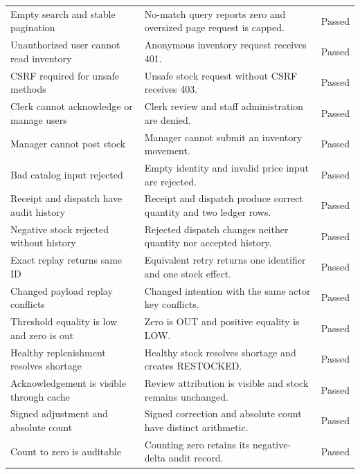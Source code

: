\begin{longtable}{>{\raggedright\arraybackslash}p{}>{\raggedright\arraybackslash}p{}>{\raggedright\arraybackslash}p{}}
\leavevmode{}Empty search and stable pagination & \leavevmode{}No-match query reports zero and oversized page request is capped. & \leavevmode{}Passed \\
\leavevmode{}Unauthorized user cannot read inventory & \leavevmode{}Anonymous inventory request receives 401. & \leavevmode{}Passed \\
\leavevmode{}CSRF required for unsafe methods & \leavevmode{}Unsafe stock request without CSRF receives 403. & \leavevmode{}Passed \\
\leavevmode{}Clerk cannot acknowledge or manage users & \leavevmode{}Clerk review and staff administration are denied. & \leavevmode{}Passed \\
\leavevmode{}Manager cannot post stock & \leavevmode{}Manager cannot submit an inventory movement. & \leavevmode{}Passed \\
\leavevmode{}Bad catalog input rejected & \leavevmode{}Empty identity and invalid price input are rejected. & \leavevmode{}Passed \\
\leavevmode{}Receipt and dispatch have audit history & \leavevmode{}Receipt and dispatch produce correct quantity and two ledger rows. & \leavevmode{}Passed \\
\leavevmode{}Negative stock rejected without history & \leavevmode{}Rejected dispatch changes neither quantity nor accepted history. & \leavevmode{}Passed \\
\leavevmode{}Exact replay returns same ID & \leavevmode{}Equivalent retry returns one identifier and one stock effect. & \leavevmode{}Passed \\
\leavevmode{}Changed payload replay conflicts & \leavevmode{}Changed intention with the same actor key conflicts. & \leavevmode{}Passed \\
\leavevmode{}Threshold equality is low and zero is out & \leavevmode{}Zero is OUT and positive equality is LOW. & \leavevmode{}Passed \\
\leavevmode{}Healthy replenishment resolves shortage & \leavevmode{}Healthy stock resolves shortage and creates RESTOCKED. & \leavevmode{}Passed \\
\leavevmode{}Acknowledgement is visible through cache & \leavevmode{}Review attribution is visible and stock remains unchanged. & \leavevmode{}Passed \\
\leavevmode{}Signed adjustment and absolute count & \leavevmode{}Signed correction and absolute count have distinct arithmetic. & \leavevmode{}Passed \\
\leavevmode{}Count to zero is auditable & \leavevmode{}Counting zero retains its negative-delta audit record. & \leavevmode{}Passed \\

\end{longtable}
